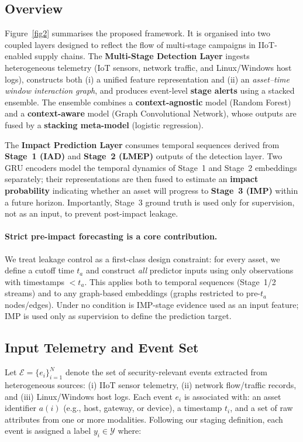 \documentclass[pdflatex,sn-mathphys-num]{sn-jnl}
\theoremstyle{thmstyleone}%
\theoremstyle{thmstyletwo}%
\theoremstyle{thmstylethree}%
\begin{document}
\subsection{Overview}
\label{sec:framework_overview}
Figure~\ref{fig2} summarises the proposed framework. It is organised into two coupled layers designed to reflect the flow of multi-stage campaigns in IIoT-enabled supply chains. The \textbf{Multi-Stage Detection Layer} ingests heterogeneous telemetry (IoT sensors, network traffic, and Linux/Windows host logs), constructs both (i) a unified feature representation and (ii) an \emph{asset--time window interaction graph}, and produces event-level \textbf{stage alerts} using a stacked ensemble. The ensemble combines a \textbf{context-agnostic} model (Random Forest) and a \textbf{context-aware} model (Graph Convolutional Network), whose outputs are fused by a \textbf{stacking meta-model} (logistic regression).

The \textbf{Impact Prediction Layer} consumes temporal sequences derived from \textbf{Stage~1 (IAD)} and \textbf{Stage~2 (LMEP)} outputs of the detection layer. Two GRU encoders model the temporal dynamics of Stage~1 and Stage~2 embeddings separately; their representations are then fused to estimate an \textbf{impact probability} indicating whether an asset will progress to \textbf{Stage~3 (IMP)} within a future horizon. Importantly, Stage~3 ground truth is used only for supervision, not as an input, to prevent post-impact leakage.

\paragraph{Strict pre-impact forecasting is a core contribution.}
We treat leakage control as a first-class design constraint: for every asset, we define a cutoff time $t_a$ and construct \emph{all} predictor inputs using only observations with timestamps $<t_a$. This applies both to temporal sequences (Stage~1/2 streams) and to any graph-based embeddings (graphs restricted to pre-$t_a$ nodes/edges). Under no condition is IMP-stage evidence used as an input feature; IMP is used only as supervision to define the prediction target.


\subsection{Input Telemetry and Event Set}
\label{sec:framework_inputs}
Let $\mathcal{E}=\{e_i\}_{i=1}^{N}$ denote the set of security-relevant events extracted from heterogeneous sources: (i) IIoT sensor telemetry, (ii) network flow/traffic records, and (iii) Linux/Windows host logs. Each event $e_i$ is associated with: an asset identifier $a(i)$ (e.g., host, gateway, or device), a timestamp $t_i$, and a set of raw attributes from one or more modalities. Following our staging definition, each event is assigned a label $y_i \in \mathcal{Y}$ where:
\end{document}
